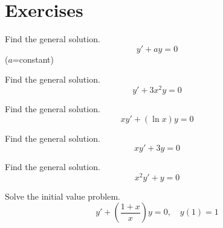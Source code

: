 \documentclass{ximera}
\begin{document}
\begin{example}
\begin{explanation}
 
 
\end{explanation}
 
\end{example}

\section*{Exercises}

\begin{problem}\label{exer:2.1.1} Find the general solution.
$$y'+ay=0$$
($a$=constant)
\end{problem}

\begin{problem}\label{exer:2.1.2} Find the general solution.
   $$y'+3x^2y=0$$ 
\end{problem}

\begin{problem}\label{exer:2.1.3} Find the general solution.
$$xy'+(\ln x)y=0$$
\end{problem}

\begin{problem}\label{exer:2.1.4} Find the general solution.
$$xy'+3y=0$$
\end{problem}

\begin{problem}\label{exer:2.1.5} Find the general solution.
$$x^2y'+y=0$$ 
\end{problem}

 \begin{problem}\label{exer:2.1.6} Solve
the initial value problem.
$$y'+\left(\frac{1+x}{x}\right)y=0,\quad y(1)=1$$
\end{problem}
\end{document}
